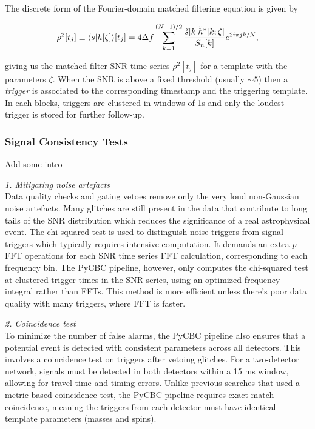 The discrete form of the Fourier-domain matched filtering equation is given by

\begin{align}
    \rho^2[t_j] \equiv \langle s | h[\zeta] \rangle[t_j] = 4 \Delta f \sum_{k=1}^{(N-1)/2} \dfrac{\tilde{s}[k]\tilde{h}^*[k;\zeta]}{S_n[k]}e^{2i\pi j k/N},
\end{align}

giving us the matched-filter SNR time series $\rho^2[t_j]$ for a template with the parameters $\zeta$. When the SNR is above a fixed threshold (usually $\sim 5$) then a \textit{trigger} is associated to the corresponding timestamp and the triggering template. In each blocks, triggers are clustered in windows of 1s and only the loudest trigger is stored for further follow-up.  

\subsubsection{Signal Consistency Tests}
Add some intro


\textit{1. Mitigating noise artefacts}\\
Data quality checks and gating vetoes remove only the very loud non-Gaussian noise artefacts. Many glitches are still present in the data that contribute to long tails of the SNR distribution which reduces the significance of a real astrophysical event. The chi-squared test is used to distinguish noise triggers from signal triggers which typically requires intensive computation. It demands an extra $p-$ FFT operations for each SNR time series FFT calculation, corresponding to each frequency bin. The PyCBC pipeline, however, only computes the chi-squared test at clustered trigger times in the SNR series, using an optimized frequency integral rather than FFTs. This method is more efficient unless there's poor data quality with many triggers, where FFT is faster.  

\textit{2. Coincidence test}\\
To minimize the number of false alarms, the PyCBC pipeline also ensures that a potential event is detected with consistent parameters across all detectors. This involves a coincidence test on triggers after vetoing glitches. For a two-detector network, signals must be detected in both detectors within a 15 ms window, allowing for travel time and timing errors. Unlike previous searches that used a metric-based coincidence test, the PyCBC pipeline requires exact-match coincidence, meaning the triggers from each detector must have identical template parameters (masses and spins).

